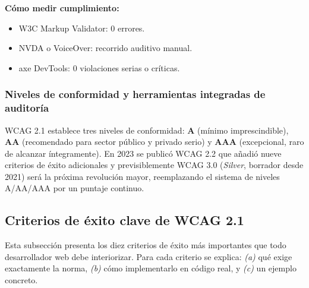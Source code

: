 \textbf{Cómo medir cumplimiento:}
\begin{itemize}
\item W3C Markup Validator: 0 errores.
\item NVDA o VoiceOver: recorrido auditivo manual.
\item axe DevTools: 0 violaciones serias o críticas.
\end{itemize}

\subsubsection{Niveles de conformidad y herramientas integradas de auditoría}

WCAG 2.1 establece tres niveles de conformidad: \textbf{A} (mínimo
imprescindible), \textbf{AA} (recomendado para sector público y
privado serio) y \textbf{AAA} (excepcional, raro de alcanzar
íntegramente). En 2023 se publicó WCAG 2.2 que añadió nueve criterios
de éxito adicionales y previsiblemente WCAG 3.0 (\emph{Silver},
borrador desde 2021) será la próxima revolución mayor, reemplazando
el sistema de niveles A/AA/AAA por un puntaje continuo.

\subsection{Criterios de éxito clave de WCAG 2.1}

Esta subsección presenta los diez criterios de éxito más importantes
que todo desarrollador web debe interiorizar. Para cada criterio se
explica: \emph{(a)} qué exige exactamente la norma, \emph{(b)} cómo
implementarlo en código real, y \emph{(c)} un ejemplo concreto.

